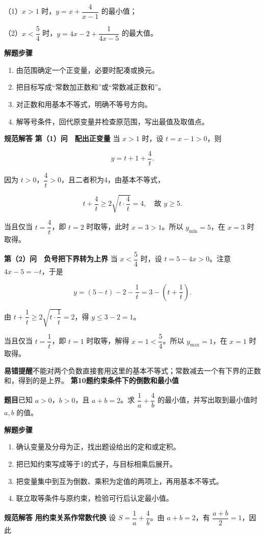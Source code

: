 \documentclass[UTF8,zihao=-4]{ctexart}
\newcommand{\subq}[1]{\par\Needspace{2\baselineskip}（#1）}
\newcommand{\labeltext}[1]{\par\textbf{#1}\quad}
\begin{document}
\subq{1}$x>1$ 时，$y=x+\dfrac4{x-1}$ 的最小值；
\subq{2}$x<\dfrac54$ 时，$y=4x-2+\dfrac1{4x-5}$ 的最大值。
\labeltext{解题步骤}\begin{enumerate}
\item 由范围确定一个正变量，必要时配凑或换元。
\item 把目标写成“常数加正数和”或“常数减正数和”。
\item 对正数和用基本不等式，明确不等号方向。
\item 解等号条件，回代原变量并检查原范围，写出最值及取值点。
\end{enumerate}
\labeltext{规范解答}
\textbf{第（1）问　配出正变量}\quad
当 $x>1$ 时，设 $t=x-1>0$，则\par
\[y=t+1+\frac4t.\]\par
因为 $t>0$，$\dfrac4t>0$，且二者积为4，由基本不等式，\par
\[t+\frac4t\ge2\sqrt{t\cdot\frac4t}=4,\quad\text{故 }y\ge5.\]\par
当且仅当 $t=\dfrac4t$，即 $t=2$ 时取等，此时 $x=3>1$。所以 $\boxed{y_{\min}=5}$，在 $\boxed{x=3}$ 时取得。\par
\par{}
\textbf{第（2）问　负号把下界转为上界}\quad
当 $x<\dfrac54$ 时，设 $t=5-4x>0$。注意 $4x-5=-t$，于是\par
\[y=(5-t)-2-\frac1t=3-\left(t+\frac1t\right).\]\par
由 $t+\dfrac1t\ge2\sqrt{t\cdot\dfrac1t}=2$，得 $y\le3-2=1$。\par
当且仅当 $t=\dfrac1t$，即 $t=1$ 时取等，解得 $x=1<\dfrac54$。所以 $\boxed{y_{\max}=1}$，在 $\boxed{x=1}$ 时取得。\par
\labeltext{易错提醒}不能对两个负数直接套用这里的基本不等式；常数减去一个有下界的正数和，得到的是上界。
\clearpage
{\Large\bfseries 第10题\quad 约束条件下的倒数和最小值}
\labeltext{题目}已知 $a>0$，$b>0$，且 $a+b=2$。求 $\dfrac1a+\dfrac4b$ 的最小值，并写出取到最小值时 $a,b$ 的值。
\labeltext{解题步骤}\begin{enumerate}
\item 确认变量及分母为正，找出题设给出的定和或定积。
\item 把已知约束写成等于1的式子，与目标相乘后展开。
\item 把变量集中到互为倒数、乘积为定值的两项上，再用基本不等式。
\item 联立取等条件与原约束，检验可行后认定最小值。
\end{enumerate}
\labeltext{规范解答}
\textbf{用约束关系作常数代换}\quad
设 $S=\dfrac1a+\dfrac4b$。由 $a+b=2$，有 $\dfrac{a+b}{2}=1$，因此\par
\end{document}

